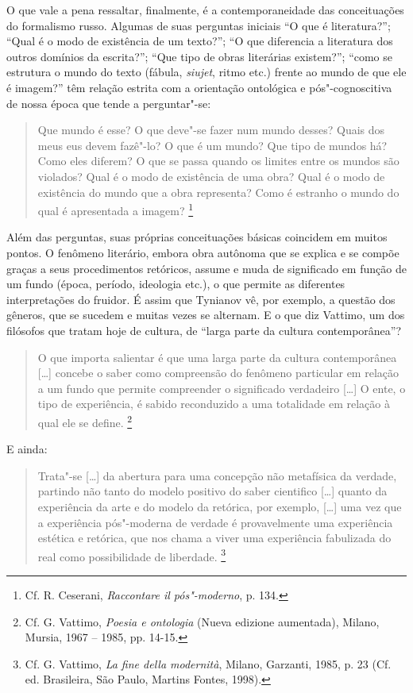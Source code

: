 O que vale a pena ressaltar, finalmente, é a contemporaneidade das
conceituações do formalismo russo. Algumas de suas perguntas iniciais
``O que é literatura?''; ``Qual é o modo de existência de um texto?'';
``O que diferencia a literatura dos outros domínios da escrita?''; ``Que
tipo de obras literárias existem?''; ``como se estrutura o mundo do
texto (fábula, \emph{siujet}, ritmo etc.) frente ao mundo de que ele é
imagem?'' têm relação estrita com a orientação ontológica e
pós"-cognoscitiva de nossa época que tende a perguntar"-se:

\begin{quote}
Que mundo é esse? O que deve"-se fazer num mundo desses? Quais dos meus
eus devem fazê"-lo? O que é um mundo? Que tipo de mundos há? Como eles
diferem? O que se passa quando os limites entre os mundos são violados?
Qual é o modo de existência de uma obra? Qual é o modo de existência do
mundo que a obra representa? Como é estranho o mundo do qual é
apresentada a imagem? \footnote{Cf. R. Ceserani, \emph{Raccontare il
  pós"-moderno}, p. 134.}
\end{quote}

Além das perguntas, suas próprias conceituações básicas coincidem em
muitos pontos. O fenômeno literário, embora obra autônoma que se explica
e se compõe graças a seus procedimentos retóricos, assume e muda de
significado em função de um fundo (época, período, ideologia etc.), o
que permite as diferentes interpretações do fruidor. É assim que
Tynianov vê, por exemplo, a questão dos gêneros, que se sucedem e muitas
vezes se alternam. E o que diz Vattimo, um dos filósofos que tratam hoje
de cultura, de ``larga parte da cultura contemporânea''?

\begin{quote}
O que importa salientar é que uma larga parte da cultura contemporânea
{[}\ldots{}{]} concebe o saber como compreensão do fenômeno particular em
relação a um fundo que permite compreender o significado verdadeiro
{[}\ldots{}{]} O ente, o tipo de experiência, é sabido reconduzido a uma
totalidade em relação à qual ele se define. \footnote{Cf. G. Vattimo,
  \emph{Poesia e ontologia} (Nueva edizione aumentada), Milano, Mursia,
  1967 -- 1985, pp. 14-15.}
\end{quote}

E ainda:

\begin{quote}
Trata"-se {[}\ldots{}{]} da abertura para uma concepção não metafísica da
verdade, partindo não tanto do modelo positivo do saber cientifico
{[}\ldots{}{]} quanto da experiência da arte e do modelo da retórica, por
exemplo, {[}\ldots{}{]} uma vez que a experiência pós"-moderna de verdade é
provavelmente uma experiência estética e retórica, que nos chama a viver
uma experiência fabulizada do real como possibilidade de liberdade.
\footnote{Cf. G. Vattimo, \emph{La fine della modernità}, Milano,
  Garzanti, 1985, p. 23 (Cf. ed. Brasileira, São Paulo, Martins Fontes,
  1998).}
\end{quote}

